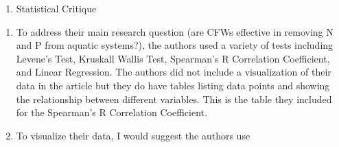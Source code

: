 \documentclass[
  letterpaper,
  DIV=11,
  numbers=noendperiod]{scrartcl}
\providecommand{\tightlist}{%
  \setlength{\itemsep}{0pt}\setlength{\parskip}{0pt}}\usepackage{longtable,booktabs,array}
\begin{document}
\begin{enumerate}
\def\labelenumi{\arabic{enumi}.}
\setcounter{enumi}{2}
\tightlist
\item
  Statistical Critique
\end{enumerate}

\begin{enumerate}
\def\labelenumi{\alph{enumi}.}
\item
  To address their main research question (are CFWs effective in
  removing N and P from aquatic systems?), the authors used a variety of
  tests including Levene's Test, Kruskall Wallis Test, Spearman's R
  Correlation Coefficient, and Linear Regression. The authors did not
  include a visualization of their data in the article but they do have
  tables listing data points and showing the relationship between
  different variables. This is the table they included for the
  Spearman's R Correlation Coefficient.
\item
  To visualize their data, I would suggest the authors use
\end{enumerate}
\end{document}
